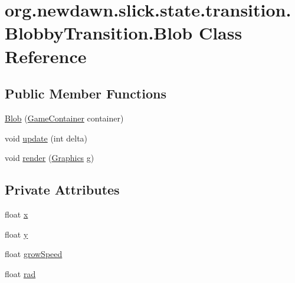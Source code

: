 \hypertarget{classorg_1_1newdawn_1_1slick_1_1state_1_1transition_1_1_blobby_transition_1_1_blob}{}\section{org.\+newdawn.\+slick.\+state.\+transition.\+Blobby\+Transition.\+Blob Class Reference}
\label{classorg_1_1newdawn_1_1slick_1_1state_1_1transition_1_1_blobby_transition_1_1_blob}
\subsection*{Public Member Functions}
\begin{DoxyCompactItemize}
\item 
\mbox{\hyperlink{classorg_1_1newdawn_1_1slick_1_1state_1_1transition_1_1_blobby_transition_1_1_blob_ab1b40eda2938b706839b2dbf57b6a02e}{Blob}} (\mbox{\hyperlink{classorg_1_1newdawn_1_1slick_1_1_game_container}{Game\+Container}} container)
\item 
void \mbox{\hyperlink{classorg_1_1newdawn_1_1slick_1_1state_1_1transition_1_1_blobby_transition_1_1_blob_a7c1bf72bc3cbeccbee6a41b6f0ab4f3f}{update}} (int delta)
\item 
void \mbox{\hyperlink{classorg_1_1newdawn_1_1slick_1_1state_1_1transition_1_1_blobby_transition_1_1_blob_a26fabc726e7bdccf9287f104eae21d3c}{render}} (\mbox{\hyperlink{classorg_1_1newdawn_1_1slick_1_1_graphics}{Graphics}} g)
\end{DoxyCompactItemize}
\subsection*{Private Attributes}
\begin{DoxyCompactItemize}
\item 
float \mbox{\hyperlink{classorg_1_1newdawn_1_1slick_1_1state_1_1transition_1_1_blobby_transition_1_1_blob_a5026febe6bf250f540a3c1dd931075e0}{x}}
\item 
float \mbox{\hyperlink{classorg_1_1newdawn_1_1slick_1_1state_1_1transition_1_1_blobby_transition_1_1_blob_a0880120ef6ca11df411b7e37a69bdad3}{y}}
\item 
float \mbox{\hyperlink{classorg_1_1newdawn_1_1slick_1_1state_1_1transition_1_1_blobby_transition_1_1_blob_a8fd7600bebcc9b209c3eeee0a83e8dc8}{grow\+Speed}}
\item 
float \mbox{\hyperlink{classorg_1_1newdawn_1_1slick_1_1state_1_1transition_1_1_blobby_transition_1_1_blob_a51823cbba4d39976abf9c6a567c8be5a}{rad}}
\end{DoxyCompactItemize}


